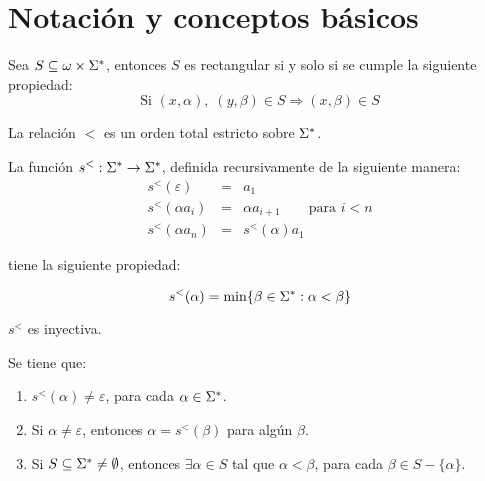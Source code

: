 \section{Notación y conceptos básicos}

  \begin{lemma}
    \PN Sea $S \subseteq \omega \times \Sigma^{\ast}$, entonces $S$ es rectangular si y solo si se cumple la siguiente
    propiedad:
    \[
      \text{Si } (x, \alpha), \; (y, \beta) \in S \Rightarrow (x, \beta) \in S
    \]
  \end{lemma}

  \begin{lemma}
    \PN La relación $<$ es un orden total estricto sobre $\Sigma^{\ast}$.
  \end{lemma}

  \begin{lemma}
    \PN La función $s^{<}: \Sigma^{\ast} \rightarrow \Sigma^{\ast}$, definida recursivamente de la siguiente manera:
    \begin{eqnarray*}
  		s^{<}(\varepsilon) &=& a_{1} \\
  		s^{<}(\alpha a_{i}) &=& \alpha a_{i+1} \qquad \text{para } i < n \\
  		s^{<}(\alpha a_{n}) &=& s^{<}(\alpha) a_{1}
    \end{eqnarray*}

    \PN tiene la siguiente propiedad:

    \[
      s^{<}(\alpha) = \min \{\beta \in \Sigma^{\ast}: \alpha < \beta\}
    \]
  \end{lemma}

  \begin{corollary}
    \PN $s^{<}$ es inyectiva.
  \end{corollary}

  \begin{lemma}
    \PN Se tiene que:

    \begin{enumerate}
      \item $s^{<}(\alpha) \neq \varepsilon$, para cada $\alpha \in \Sigma^{\ast}$.
      \item Si $\alpha \neq \varepsilon$, entonces $\alpha = s^{<}(\beta)$ para algún $\beta$.
      \item Si $S\subseteq \Sigma^{\ast} \neq \emptyset$, entonces $\exists \alpha \in S$ tal que $\alpha < \beta$, para cada
      $\beta \in S - \{\alpha\}$.
    \end{enumerate}
  \end{lemma}

